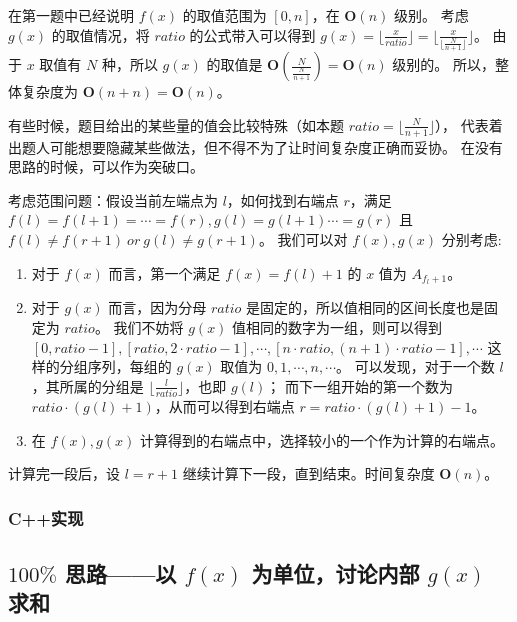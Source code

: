 在第一题中已经说明 $f(x)$ 的取值范围为 $[0,n]$，在 $\mathbf{O}(n)$ 级别。
考虑 $g(x)$ 的取值情况，将 $ratio$ 的公式带入可以得到 $g(x)=\lfloor \frac{x}{ratio}\rfloor=\lfloor\frac{x}{\lfloor \frac{N}{n+1}\rfloor}\rfloor$。
由于 $x$ 取值有 $N$ 种，所以 $g(x)$ 的取值是 $\mathbf{O}(\frac{N}{\frac{N}{n+1}})=\mathbf{O}(n)$ 级别的。
所以，整体复杂度为 $\mathbf{O}(n+n)=\mathbf{O}(n)$。

\begin{note}
    有些时候，题目给出的某些量的值会比较特殊（如本题 $ratio=\lfloor\frac{N}{n+1}\rfloor$），
    代表着出题人可能想要隐藏某些做法，但不得不为了让时间复杂度正确而妥协。
    在没有思路的时候，可以作为突破口。
\end{note}

考虑范围问题：假设当前左端点为 $l$，如何找到右端点 $r$，满足 $f(l)=f(l+1)=\cdots=f(r),g(l)=g(l+1)\cdots=g(r)$ 且 $f(l)\not=f(r+1)\ or\ g(l)\not=g(r+1)$。
我们可以对 $f(x),g(x)$ 分别考虑:

\begin{enumerate}
    \item 对于 $f(x)$ 而言，第一个满足 $f(x)=f(l)+1$ 的 $x$ 值为 $A_{f_l + 1}$。
    \item 对于 $g(x)$ 而言，因为分母 $ratio$ 是固定的，所以值相同的区间长度也是固定为 $ratio$。
          我们不妨将 $g(x)$ 值相同的数字为一组，则可以得到 $[0,ratio-1],[ratio,2\cdot ratio-1],\cdots,[n\cdot ratio,(n+1)\cdot ratio-1],\cdots$
          这样的分组序列，每组的 $g(x)$ 取值为 $0,1,\cdots,n,\cdots$。
          可以发现，对于一个数 $l$，其所属的分组是 $\lfloor \frac{l}{ratio}\rfloor$，也即 $g(l)$；
          而下一组开始的第一个数为 $ratio\cdot (g(l)+1)$，从而可以得到右端点 $r = ratio\cdot (g(l)+1) - 1$。
    \item 在 $f(x),g(x)$ 计算得到的右端点中，选择较小的一个作为计算的右端点。
\end{enumerate}

计算完一段后，设 $l=r+1$ 继续计算下一段，直到结束。时间复杂度 $\mathbf{O}(n)$。

\subsubsection{C++实现}



\subsection{\texorpdfstring{$100\%$}{100\%} 思路——以 \texorpdfstring{$f(x)$}{f(x)} 为单位，讨论内部 \texorpdfstring{$g(x)$}{g(x)} 求和}

